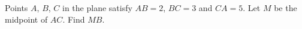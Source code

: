 Points $A$, $B$, $C$ in the plane satisfy $AB=2$, $BC=3$ and $CA=5$. Let $M$ be the midpoint of $AC$. Find $MB$.
